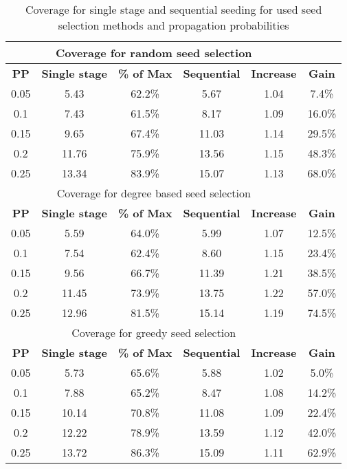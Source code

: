 \documentclass[11pt]{article} %
\begin{document}
\begin {table}
\centering
\begin{tabular}{ c c c c c c} 
\hline
\multicolumn{5}{c}{Coverage for random seed selection} \\
\hline
\textbf{PP}& \textbf {Single stage} & \textbf {\% of Max} & \textbf{Sequential} & \textbf{Increase} & \textbf {Gain} \\ 
\hline
0.05 & 5.43 & 62.2\% & 5.67 & 1.04 & 7.4\% \\ 
\hline
0.1	& 7.43 & 61.5\% & 8.17 & 1.09 & 16.0\% \\ 
\hline
0.15 & 9.65 & 67.4\% & 11.03 & 1.14 & 29.5\% \\ 
\hline
0.2	& 11.76 & 75.9\% & 13.56 & 1.15 & 48.3\% \\ 
\hline
0.25	& 13.34 & 83.9\% & 15.07 & 1.13 & 68.0\% \\ 
\hline


\multicolumn{5}{c}{Coverage for degree based seed selection} \\
\hline
\textbf{PP}& \textbf {Single stage} & \textbf {\% of Max} & \textbf{Sequential} & \textbf{Increase} & \textbf {Gain} \\ 
\hline

0.05 & 5.59 & 64.0\% & 5.99 & 1.07 & 12.5\% \\ 
0.1 & 7.54 & 62.4\% & 8.60 & 1.15 & 23.4\% \\ 
0.15 & 9.56 & 66.7\% & 11.39 & 1.21 & 38.5\% \\ 
0.2 & 11.45 & 73.9\% & 13.75 & 1.22 & 57.0\% \\ 
0.25 & 12.96&  81.5\% & 15.14 & 1.19 & 74.5\% \\ 


\multicolumn{5}{c}{Coverage for greedy seed selection} \\
\hline
\textbf{PP}& \textbf {Single stage} & \textbf {\% of Max} & \textbf{Sequential} & \textbf{Increase} & \textbf {Gain} \\ 
\hline

0.05 & 5.73 & 65.6\% & 5.88 & 1.02 & 5.0\% \\ 
0.1 & 7.88 & 65.2\% & 8.47 & 1.08 & 14.2\% \\ 
0.15 & 10.14 & 70.8\% & 11.08 & 1.09 & 22.4\% \\ 
0.2 & 12.22 & 78.9\% & 13.59 & 1.12 & 42.0\% \\ 
0.25 & 13.72 & 86.3\% & 15.09 & 1.11 & 62.9\% \\ 

\end{tabular}
\caption {Coverage for single stage and sequential seeding for used seed selection methods and propagation probabilities}
\label{tab:table3} 
\end {table}
\end{document}
